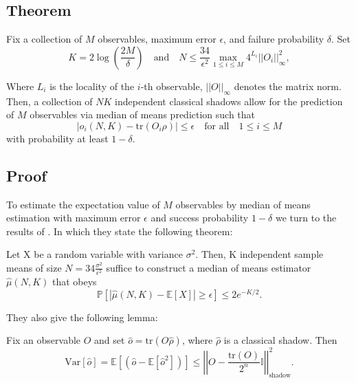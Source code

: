 \documentclass[12pt]{article}
\begin{document}
    \subsection{Theorem}

    Fix a collection of $M$ observables, maximum error $\epsilon$, and failure probability $\delta$. Set 
    \begin{equation*}
        K = 2 \log{\left(\frac{2M}{\delta}\right)} \quad \text{and} \quad N \leq \frac{34}{\epsilon^2} \max_{1 \leq i \leq M} 4^{L_i} ||O_i||^2_\infty,
    \end{equation*}

    Where $L_i$ is the locality of the $i$-th observable, $||O||_\infty$ denotes the matrix norm. Then, a collection of $NK$ independent classical shadows allow for the prediction of $M$ observables via median of means prediction such that
    \begin{equation*}
        |\hat{o}_i(N,K) - \text{tr}(O_i\rho)| \leq \epsilon \quad \text{for all} \quad 1 \leq i \leq M
    \end{equation*}
    with probability at least $1-\delta$.

    \subsection{Proof}
    To estimate the expectation value of $M$ observables by median of means estimation with maximum error $\epsilon$ and success probability $1-\delta$ we turn to the results of \cite{Huang_Kueng_Preskill_2020}. In which they state the following theorem:
    \begin{theorem}
        Let X be a random variable with variance $\sigma^2$. Then, K independent sample means of size $N = 34 \frac{\sigma^2}{\epsilon^2}$ suffice to construct a median of means estimator $\hat{\mu}(N, K)$ that obeys 
        \begin{equation}
            \mathbb{P}[|\hat{\mu}(N, K) - \mathbb{E}[X]| \geq \epsilon] \leq 2e^{-K/2}.
        \end{equation}
    \end{theorem}

    They also give the following lemma:
    \begin{lemma}
        Fix an observable $O$ and set $\hat{o} = \text{tr}(O\hat{\rho})$, where $\hat{\rho}$ is a classical shadow. Then
        \begin{equation}
            \text{Var}[\hat{o}] = \mathbb{E}\left[(\hat{o}-\mathbb{E}[\hat{o}^2])\right] \leq \left|\left| O - \frac{\text{tr}(O)}{2^n} \mathbb{I} \right|\right|^2_\text{shadow}.
        \end{equation}
    \end{lemma}
\end{document}
